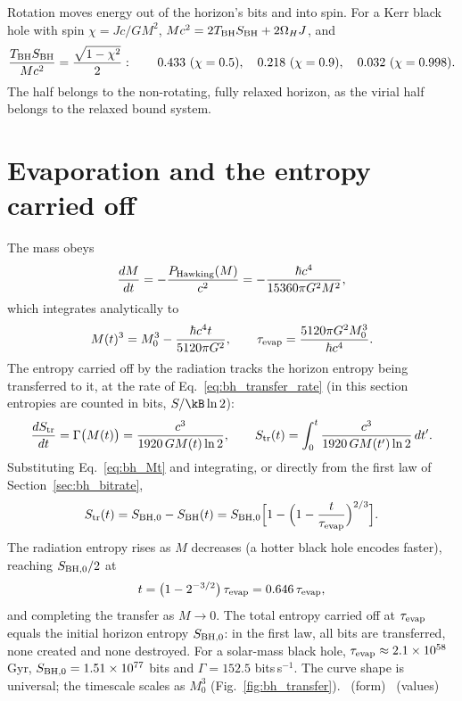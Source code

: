 Rotation moves energy out of the horizon's bits and into spin. For a Kerr black hole with spin $\chi=Jc/GM^2$, $Mc^2=2T_{\rm BH}S_{\rm BH}+2\Omega_HJ$, and
\begin{equation}
\frac{T_{\rm BH}S_{\rm BH}}{Mc^2}=\frac{\sqrt{1-\chi^2}}{2}:\qquad 0.433\ (\chi=0.5),\quad 0.218\ (\chi=0.9),\quad 0.032\ (\chi=0.998).
\end{equation}
The half belongs to the non-rotating, fully relaxed horizon, as the virial half belongs to the relaxed bound system. \derived

\section{Evaporation and the entropy carried off}\label{sec:bh_evap}
The mass obeys
\begin{equation}
\frac{dM}{dt}=-\frac{P_{\rm Hawking}(M)}{c^2}=-\frac{\hbar c^4}{15360\pi G^2M^2},\label{eq:bh_dMdt}
\end{equation}
which integrates analytically to
\begin{equation}
M(t)^3=M_0^3-\frac{\hbar c^4t}{5120\pi G^2},\qquad \tau_{\rm evap}=\frac{5120\pi G^2M_0^3}{\hbar c^4}.\label{eq:bh_Mt}
\end{equation}
The entropy carried off by the radiation tracks the horizon entropy being transferred to it, at the rate of Eq.~\eqref{eq:bh_transfer_rate} (in this section entropies are counted in bits, $S/\kB\ln2$):
\begin{equation}
\frac{dS_{\rm tr}}{dt}=\Gamma\big(M(t)\big)=\frac{c^3}{1920\,GM(t)\ln2},\qquad
S_{\rm tr}(t)=\int_0^t\frac{c^3}{1920\,GM(t')\ln2}\,dt'.\label{eq:bh_Str}
\end{equation}
Substituting Eq.~\eqref{eq:bh_Mt} and integrating, or directly from the first law of Section~\ref{sec:bh_bitrate},
\begin{equation}
S_{\rm tr}(t)=S_{\rm BH,0}-S_{\rm BH}(t)=S_{\rm BH,0}\Big[1-\Big(1-\frac{t}{\tau_{\rm evap}}\Big)^{2/3}\Big].\label{eq:bh_Str_closed}
\end{equation}
The radiation entropy rises as $M$ decreases (a hotter black hole encodes faster), reaching $S_{\rm BH,0}/2$ at
\begin{equation}
t=\big(1-2^{-3/2}\big)\,\tau_{\rm evap}=0.646\,\tau_{\rm evap},
\end{equation}
and completing the transfer as $M\to0$. The total entropy carried off at $\tau_{\rm evap}$ equals the initial horizon entropy $S_{\rm BH,0}$: in the first law, all bits are
transferred, none created and none destroyed. For a solar-mass black hole, $\tau_{\rm evap}\approx2.1\times10^{58}$\,Gyr, $S_{\rm BH,0}=1.51\times10^{77}$ bits and
$\Gamma=152.5$ bits\,s$^{-1}$. The curve shape is universal; the timescale scales as $M_0^3$ (Fig.~\ref{fig:bh_transfer}). \derived\ (form) \calc\ (values)

